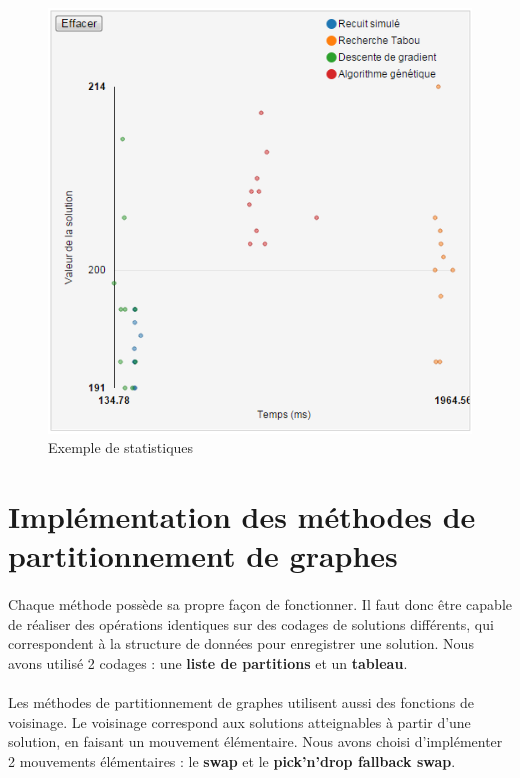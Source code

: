 \documentclass[12pt]{article}
\begin{document}
\begin{figure}[!h]
	\begin{center}
		\includegraphics[scale=0.5]{pictures/exempleStatistics.png}
	\end{center}
	\caption{Exemple de statistiques \label{fig:statistics}}
\end{figure}

\section{Implémentation des méthodes de partitionnement de graphes}

\paragraph{}Chaque méthode possède sa propre façon de fonctionner. Il faut donc être capable de réaliser des opérations identiques sur des codages de solutions différents, qui correspondent à la structure de données pour enregistrer une solution. Nous avons utilisé 2 codages : une \textbf{liste de partitions} et un \textbf{tableau}.
\paragraph{}Les méthodes de partitionnement de graphes utilisent aussi des fonctions de voisinage. Le voisinage correspond aux solutions atteignables à partir d'une solution, en faisant un mouvement élémentaire. Nous avons choisi d'implémenter 2 mouvements élémentaires : le \textbf{swap} et le \textbf{pick'n'drop fallback swap}.
\end{document}
